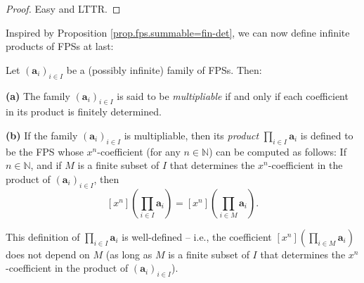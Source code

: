 \begin{proof}
Easy and LTTR.
\end{proof}

Inspired by Proposition \ref{prop.fps.summable=fin-det}, we can now define
infinite products of FPSs at last:

\begin{definition}
\label{def.fps.multipliable}Let $\left(  \mathbf{a}_{i}\right)  _{i\in I}$ be
a (possibly infinite) family of FPSs. Then: \medskip

\textbf{(a)} The family $\left(  \mathbf{a}_{i}\right)  _{i\in I}$ is said to
be \emph{multipliable} if and only if each coefficient in its product is
finitely determined. \medskip

\textbf{(b)} If the family $\left(  \mathbf{a}_{i}\right)  _{i\in I}$ is
multipliable, then its \emph{product} $\prod_{i\in I}\mathbf{a}_{i}$ is
defined to be the FPS whose $x^{n}$-coefficient (for any $n\in\mathbb{N}$) can
be computed as follows: If $n\in\mathbb{N}$, and if $M$ is a finite subset of
$I$ that determines the $x^{n}$-coefficient in the product of $\left(
\mathbf{a}_{i}\right)  _{i\in I}$, then
\[
\left[  x^{n}\right]  \left(  \prod_{i\in I}\mathbf{a}_{i}\right)  =\left[
x^{n}\right]  \left(  \prod_{i\in M}\mathbf{a}_{i}\right)  .
\]

\end{definition}

\begin{proposition}
\label{prop.fps.multipliable.prod-wd}This definition of $\prod_{i\in
I}\mathbf{a}_{i}$ is well-defined -- i.e., the coefficient $\left[
x^{n}\right]  \left(  \prod_{i\in M}\mathbf{a}_{i}\right)  $ does not depend
on $M$ (as long as $M$ is a finite subset of $I$ that determines the $x^{n}%
$-coefficient in the product of $\left(  \mathbf{a}_{i}\right)  _{i\in I}$).
\end{proposition}

